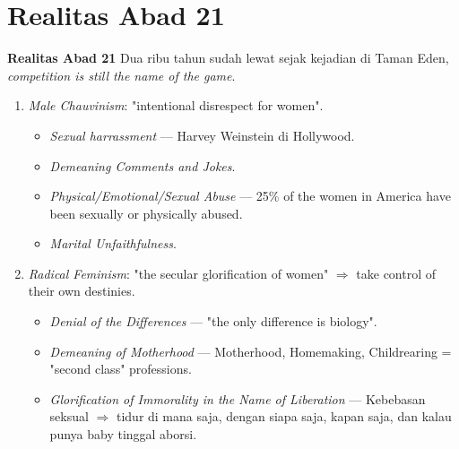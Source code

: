 \documentclass{beamer}
\theoremstyle{mystyle}
\begin{document}
\section{Realitas Abad 21}
\begin{frame}{\textbf{Realitas Abad 21}}
	Dua ribu tahun sudah lewat sejak kejadian di Taman Eden, \textit{competition is still the name of the game}.
	
	\begin{enumerate}
		\item<2-> \textit{Male Chauvinism}: "intentional disrespect for women".
			\begin{itemize}
				\item<3-> \textit{Sexual harrassment} --- Harvey Weinstein di Hollywood.
				\item<4-> \textit{Demeaning Comments and Jokes}.
				\item<5-> \textit{Physical/Emotional/Sexual Abuse} --- 25\% of the women in America have been sexually or physically abused.
				\item<6-> \textit{Marital Unfaithfulness}.				
			\end{itemize}
		\item<2-> \textit{Radical Feminism}: "the secular glorification of women" $\Rightarrow$ take control of their own destinies.		
			\begin{itemize}
				\item<7-> \textit{Denial of the Differences} --- "the only difference is biology". 
				\item<8-> \textit{Demeaning of Motherhood} --- Motherhood, Homemaking, Childrearing = "second class" professions.
				\item<9-> \textit{Glorification of Immorality in the Name of Liberation} --- Kebebasan seksual $\Rightarrow$ tidur di mana saja, dengan siapa saja, kapan saja, dan kalau punya baby tinggal aborsi.
			\end{itemize}
	\end{enumerate}
\end{frame}
\end{document}
